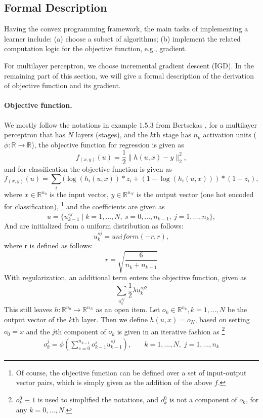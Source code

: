 \subsection{Formal Description}
Having the convex programming framework, the main tasks of implementing a learner include:
(a) choose a subset of algorithms;
(b) implement the related computation logic for the objective function, e.g., gradient.

For multilayer perceptron, we choose incremental gradient descent (IGD).
In the remaining part of this section, we will give a formal description of the derivation of objective function and its gradient.

\paragraph{Objective function.}
We mostly follow the notations in example 1.5.3 from Bertsekas \cite{bertsekas1999nonlinear}, for a multilayer perceptron that has $N$ layers (stages), and the $k$th stage has $n_k$ activation units ($\phi : \mathbb{R} \to \mathbb{R}$), the objective function for regression is given as
\[f_{(x, y)}(u) = \frac{1}{2} \|h(u, x) - y\|_2^2,\]
and for classification the objective function is given as
\[f_{(x, y)}(u) = \sum_i (\log(h_i(u, x)) * z_i + (1-\log(h_i(u, x))) *( 1- z_i) ,\]
where $x \in \mathbb{R}^{n_0}$ is the input vector, $y \in \mathbb{R}^{n_N}$ is the output vector (one hot encoded for classification),
\footnote{Of course, the objective function can be defined over a set of input-output vector pairs, which is simply given as the addition of the above $f$.}
and the coefficients are given as
\[u = \{ u_{k-1}^{sj} \; | \; k = 1,...,N, \: s = 0,...,n_{k-1}, \: j = 1,...,n_k\},\]
And are initialized from a uniform distribution as follows:
\[u_{k}^{sj} = uniform(-r,r),\]
where r is defined as follows:
\[r = \sqrt{\frac{6}{n_k+n_{k+1}}}\]
With regularization, an additional term enters the objective function, given as
\[\sum_{u_k^{sj}} \frac{1}{2} \lambda u_k^{sj2} \]
This still leaves $h : \mathbb{R}^{n_0} \to \mathbb{R}^{n_N}$ as an open item.
Let $o_k \in \mathbb{R}^{n_k}, k = 1,...,N$ be the output vector of the $k$th layer. Then we define $h(u, x) = o_N$, based on setting $o_0 = x$ and the $j$th component of $o_k$ is given in an iterative fashion as
\footnote{$o_k^0 \equiv 1$ is used to simplified the notations, and $o_k^0$ is not a component of $o_k$, for any $k = 0,...,N$.}
\[\begin{alignedat}{5}
    o_k^j = \phi \left( \sum_{s=0}^{n_{k-1}} o_{k-1}^s u_{k-1}^{sj} \right), &\quad k = 1,...,N, \; j = 1,...,n_k
\end{alignedat}\]

